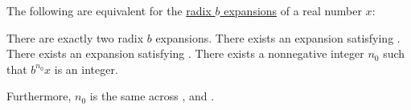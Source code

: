 \begin{corollary}\label{thm:radix_expansion_non_uniqueness}
  The following are equivalent for the \hyperref[def:real_number_radix_expansion]{radix \( b \) expansions} of a real number \( x \):
  \begin{thmenum}
     There are exactly two radix \( b \) expansions.
     There exists an expansion satisfying .
     There exists an expansion satisfying .
     There exists a nonnegative integer \( n_0 \) such that \( b^{n_0} x \) is an integer.
  \end{thmenum}

  Furthermore, \( n_0 \) is the same across ,  and .
\end{corollary}
